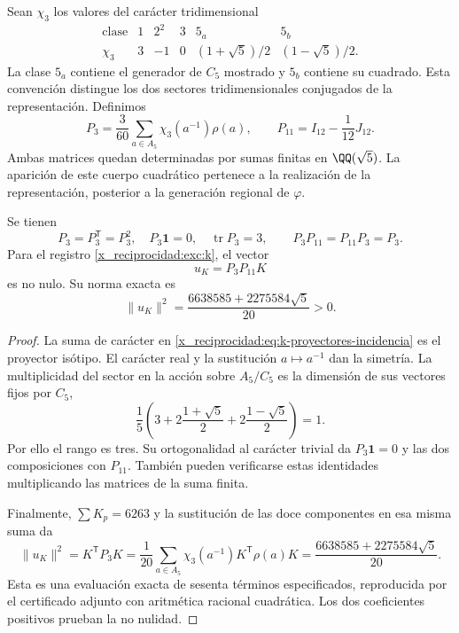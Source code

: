 Sean \(\chi_3\) los valores del carácter tridimensional
\[
\begin{array}{c|ccccc}
\text{clase}&1&2^2&3&5_a&5_b\\ \hline
\chi_3&3&-1&0&(1+\sqrt5)/2&(1-\sqrt5)/2.
\end{array}
\]
La clase \(5_a\) contiene el generador de \(C_5\) mostrado y
\(5_b\) contiene su cuadrado. Esta convención distingue los dos
sectores tridimensionales conjugados de la representación. Definimos
\begin{equation}
 P_3=\frac3{60}\sum_{a\in A_5}\chi_3(a^{-1})\rho(a),
 \qquad P_{11}=I_{12}-\frac1{12}J_{12}.
 \label{x_reciprocidad:eq:k-proyectores-incidencia}
\end{equation}
Ambas matrices quedan determinadas por sumas finitas en
\(\QQ(\sqrt5)\). La aparición de este cuerpo cuadrático pertenece
a la realización de la representación, posterior a la generación
regional de \(\varphi\).

\begin{lemma}
\label{x_reciprocidad:lem:k-sector-no-nulo}
Se tienen
\[
 P_3=P_3^{\mathsf T}=P_3^2,\quad
 P_3\mathbf1=0,\quad \operatorname{tr}P_3=3,
 \qquad P_3P_{11}=P_{11}P_3=P_3.
\]
Para el registro \eqref{x_reciprocidad:exc:k}, el vector
\begin{equation}
 u_K=P_3P_{11}K
 \label{x_reciprocidad:eq:k-vector-direccional}
\end{equation}
es no nulo. Su norma exacta es
\begin{equation}
 \lVert u_K\rVert^2
 =\frac{6638585+2275584\sqrt5}{20}>0.
 \label{x_reciprocidad:eq:k-norma-direccion}
\end{equation}
\end{lemma}
\begin{proof}
La suma de carácter en \eqref{x_reciprocidad:eq:k-proyectores-incidencia} es el
proyector isótipo. El carácter real y la sustitución \(a\mapsto a^{-1}\)
dan la simetría. La multiplicidad del sector en la acción sobre
\(A_5/C_5\) es la dimensión de sus vectores fijos por \(C_5\),
\[
 \frac15\left(3+2\frac{1+\sqrt5}{2}
                 +2\frac{1-\sqrt5}{2}\right)=1.
\]
Por ello el rango es tres. Su ortogonalidad al carácter trivial
da \(P_3\mathbf1=0\) y las dos composiciones con \(P_{11}\).
También pueden verificarse estas identidades multiplicando las
matrices de la suma finita.

Finalmente, \(\sum K_p=6263\) y la sustitución de las doce
componentes en esa misma suma da
\[
 \lVert u_K\rVert^2=K^{\mathsf T}P_3K
 =\frac1{20}\sum_{a\in A_5}
                \chi_3(a^{-1})K^{\mathsf T}\rho(a)K
 =\frac{6638585+2275584\sqrt5}{20}.
\]
Esta es una evaluación exacta de sesenta términos especificados,
reproducida por el certificado adjunto con aritmética racional
cuadrática. Los dos coeficientes positivos prueban la no nulidad.
\end{proof}

